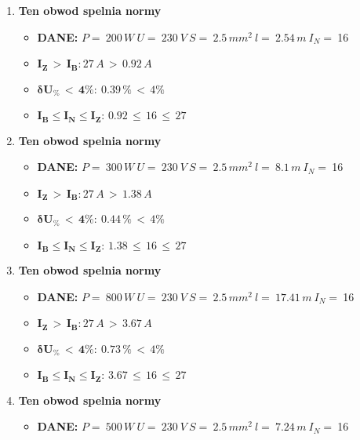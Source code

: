 \begin{enumerate}
\item \textcolor{Green}{\cmark} \textbf{Ten obwod spelnia normy} 
\begin{itemize}
\item[] \textbf{DANE: } \: $ P = \:200\, W\: U = \:230\: V\: S = \:2.5\, mm^2\: l = \:2.54\, m\: I_N= \: $16
\item[\textcolor{Green}{\cmark}] $ \pmb{I_Z \, >  \, I_B: }27 \, A \, > \,0.92 \, A $
\item[\textcolor{Green}{\cmark}] $ \pmb{ \delta U_\% \, < \, 4\%:} \:0.39 \, \% \,< \, 4\% $
\item[\textcolor{Green}{\cmark}] $ \pmb{I_B \le I_N \le I_Z: } \, 0.92 \, \le \,16 \, \le \,27 $
\end{itemize}
\item \textcolor{Green}{\cmark} \textbf{Ten obwod spelnia normy} 
\begin{itemize}
\item[] \textbf{DANE: } \: $ P = \:300\, W\: U = \:230\: V\: S = \:2.5\, mm^2\: l = \:8.1\, m\: I_N= \: $16
\item[\textcolor{Green}{\cmark}] $ \pmb{I_Z \, >  \, I_B: }27 \, A \, > \,1.38 \, A $
\item[\textcolor{Green}{\cmark}] $ \pmb{ \delta U_\% \, < \, 4\%:} \:0.44 \, \% \,< \, 4\% $
\item[\textcolor{Green}{\cmark}] $ \pmb{I_B \le I_N \le I_Z: } \, 1.38 \, \le \,16 \, \le \,27 $
\end{itemize}
\item \textcolor{Green}{\cmark} \textbf{Ten obwod spelnia normy} 
\begin{itemize}
\item[] \textbf{DANE: } \: $ P = \:800\, W\: U = \:230\: V\: S = \:2.5\, mm^2\: l = \:17.41\, m\: I_N= \: $16
\item[\textcolor{Green}{\cmark}] $ \pmb{I_Z \, >  \, I_B: }27 \, A \, > \,3.67 \, A $
\item[\textcolor{Green}{\cmark}] $ \pmb{ \delta U_\% \, < \, 4\%:} \:0.73 \, \% \,< \, 4\% $
\item[\textcolor{Green}{\cmark}] $ \pmb{I_B \le I_N \le I_Z: } \, 3.67 \, \le \,16 \, \le \,27 $
\end{itemize}
\item \textcolor{Green}{\cmark} \textbf{Ten obwod spelnia normy} 
\begin{itemize}
\item[] \textbf{DANE: } \: $ P = \:500\, W\: U = \:230\: V\: S = \:2.5\, mm^2\: l = \:7.24\, m\: I_N= \: $16

\end{itemize}
\end{enumerate}
